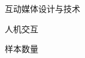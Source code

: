 \begin{denotation}[3cm]
  \item[IMDT] 互动媒体设计与技术
  \item[HCI] 人机交互
  \item[$n$] 样本数量
\end{denotation}
